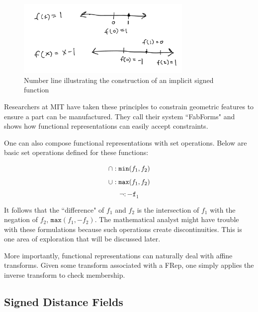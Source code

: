 \begin{figure}[h!]
  \centering
    \includegraphics[width=0.75\textwidth]{img/implicit_sketch.png}
  \caption{Number line illustrating the construction of an implicit signed function}
  \label{fig:implicit-sketch}
\end{figure}

Researchers at MIT have taken these principles to constrain
geometric features to ensure a part can be manufactured.\cite{Shugrina_Shamir_Matusik_2015}
They call their system ``FabForms" and shows how functional representations
can easily accept constraints.

One can also compose functional representations with set operations. 
Below are basic set operations defined for these functions:

\begin{equation*}
\cap : \mathtt{min}(f_1,f_2) \\
\end{equation*}
\begin{equation*}
\cup : \mathtt{max}(f_1,f_2) \\
\end{equation*}
\begin{equation*}
\neg : -\mathtt{f}_1
\end{equation*}

It follows that the ``difference"
of $f_1$ and $f_2$ is the intersection of $f_1$ with the negation of $f_2$,
$\mathtt{max}(f_1,-f_2)$.
The mathematical analyst might have trouble with these formulations because
such operations
create discontinuities. This is one area of exploration that will be discussed
later.

More importantly, functional representations can naturally deal with affine
transforms. \cite{Henderson_2002} Given some transform associated with a
FRep, one simply applies the inverse transform to check membership.


\subsection{Signed Distance Fields}

